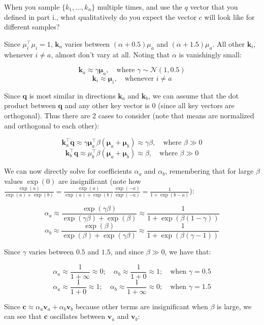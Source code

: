 \begin{parts}
\begin{subparts}
When you sample $\{k_1,\dots,k_n\}$ multiple times, and use the $q$ vector that you defined in part i., what qualitatively do you expect the vector $c$ will look like for different samples?

\begin{answer}
    Since $\mu_i^{\top}\mu_i=1$, $\mathbf{k}_a$ varies between $(\alpha + 0.5)\mu_a$ and $(\alpha + 1.5)\mu_a$. All other $\mathbf{k}_i$, whenever $i\ne a$, almost don't vary at all. Noting that $\alpha$ is vanishingly small:
    
    $$\mathbf{k}_a\approx \gamma \mathbf{\mu}_a,\quad \text{where } \gamma\sim\mathcal{N}(1, 0.5)$$
    $$\mathbf{k}_i\approx \mathbf{\mu}_i, \quad \text{whenever } i \ne a$$
    
    Since $\mathbf{q}$ is most similar in directions $\mathbf{k}_a$ and $\mathbf{k}_b$, we can assume that the dot product between $\mathbf{q}$ and any other key vector is $0$ (since all key vectors are orthogonal). Thus there are 2 cases to consider (note that means are normalized and orthogonal to each other):
    
    $$\mathbf{k}_a^{\top}\mathbf{q}\approx \gamma \mathbf{\mu}_a^{\top} \beta(\mathbf{\mu}_a + \mathbf{\mu}_b)\approx \gamma\beta,\quad \text{where }\beta \gg 0$$
    $$\mathbf{k}_b^{\top}\mathbf{q}\approx \mu_b^{\top} \beta(\mathbf{\mu}_a + \mathbf{\mu}_b)\approx \beta,\quad \text{where }\beta \gg 0$$
    
    We can now directly solve for coefficients $\alpha_a$ and $\alpha_b$, remembering that for large $\beta$ values $\exp(0)$ are insignificant (note how $\frac{\exp(a)}{\exp(a)+\exp(b)}=\frac{\exp(a)}{\exp(a)+\exp(b)}\frac{\exp(-a)}{\exp(-a)}=\frac{1}{1+\exp(b-a)}$):
    
    $$\alpha_a\approx\frac{\exp(\gamma\beta)}{\exp(\gamma\beta)+\exp(\beta)}\approx\frac{1}{1+\exp(\beta(1-\gamma))}$$
    $$\alpha_b\approx\frac{\exp(\beta)}{\exp(\beta)+\exp(\gamma\beta)}\approx\frac{1}{1+\exp(\beta(\gamma-1))}$$
    
    Since $\gamma$ varies between $0.5$ and $1.5$, and since $\beta \gg 0$, we have that:
    
    $$\alpha_a\approx\frac{1}{1+\infty}\approx 0;\quad \alpha_b\approx\frac{1}{1+0}\approx 1;\quad\text{when }\gamma=0.5$$
    $$\alpha_a\approx\frac{1}{1+0}\approx 1;\quad \alpha_b\approx\frac{1}{1+\infty}\approx 0;\quad\text{when }\gamma=1.5$$
    
    Since $\mathbf{c}\approx\alpha_a\mathbf{v}_a+\alpha_b\mathbf{v}_b$ because other terms are insignificant when $\beta$ is large, we can see that $\mathbf{c}$ oscillates between $\mathbf{v}_a$ and $\mathbf{v}_b$:
    

\end{answer}
\end{subparts}
\end{parts}
